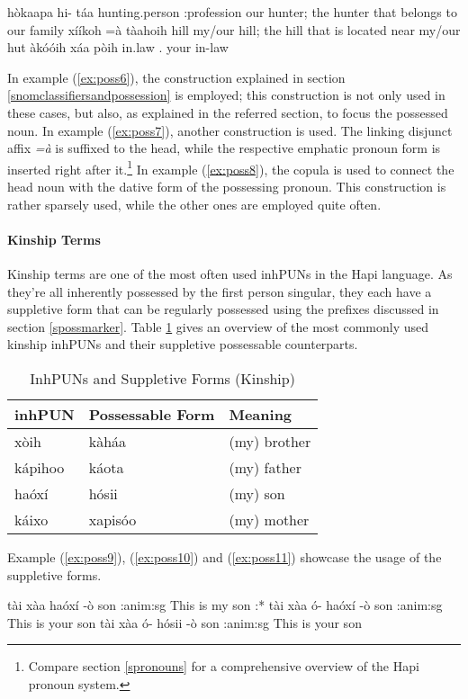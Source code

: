 \documentclass[a4paper, 12pt, oneside]{memoir}
\newcommand{\emh}[1]{\textit{#1}}
\begin{document}
\begin{examples}
\ex 
\label{ex:poss6}
\bits hòkaapa hi- táa
\gloss hunting.person {\Fpposs} {\Cl}:profession
\tr our hunter; the hunter that belongs to our family
\ex
\label{ex:poss7}
\bits xííkoh =à tàahoih
\gloss hill {\Link} {\Ff}
\tr my/our hill; the hill that is located near my/our hut
\ex
\label{ex:poss8}
\bits àkóóih xáa pòih
\gloss in.law {\Cop} {\Ss}.{\Dat}
\tr your in-law
\end{examples}
In example (\ref{ex:poss6}), the construction explained in section \ref{snomclassifiersandpossession} is employed; this construction is not only used in these cases, but also, as explained in the referred section, to focus the possessed noun. In example (\ref{ex:poss7}), another construction is used. The linking disjunct affix \emh{=à} is suffixed to the head, while the respective emphatic pronoun form is inserted right after it.\footnote{Compare section \ref{spronouns} for a comprehensive overview of the Hapi pronoun system.}
In example (\ref{ex:poss8}), the copula is used to connect the head noun with the dative form of the possessing pronoun. This construction is rather sparsely used, while the other ones are employed quite often. 
\paragraph{Kinship Terms}
Kinship terms are one of the most often used inhPUNs in the Hapi language. As they're all inherently possessed by the first person singular, they each have a suppletive form that can be regularly possessed using the prefixes discussed in section \ref{spossmarker}. Table \ref{t:kinship} gives an overview of the most commonly used kinship inhPUNs and their suppletive possessable counterparts. 
\begin{table}[H]
\centering
\begin{tabular}{@{}lll@{}}
\toprule
inhPUN & Possessable Form & Meaning \\ \midrule
xòih & kàháa & (my) brother \\
kápihoo & káota & (my) father \\
haóxí & hósii & (my) son \\
káixo & xapisóo & (my) mother \\ \bottomrule
\end{tabular}
\caption{InhPUNs and Suppletive Forms (Kinship)}
\label{t:kinship}
\end{table}
Example (\ref{ex:poss9}), (\ref{ex:poss10}) and (\ref{ex:poss11}) showcase the usage of the suppletive forms. 
\begin{examples}
\ex
\label{ex:poss9}
\bits tài xàa haóxí -ò
\gloss {\Demprox} {\Cop} son {\Cl}:anim:sg
\tr This is my son
\ex
\label{ex:poss10}
\bits:* tài xàa ó- haóxí -ò
\gloss {\Demprox} {\Cop} {\Ssposs} son {\Cl}:anim:sg
\intended This is your son
\ex
\label{ex:poss11}
\bits tài xàa ó- hósii -ò
\gloss {\Demprox} {\Cop} {\Ssposs} son {\Cl}:anim:sg
\tr This is your son
\end{examples}
\end{document}
